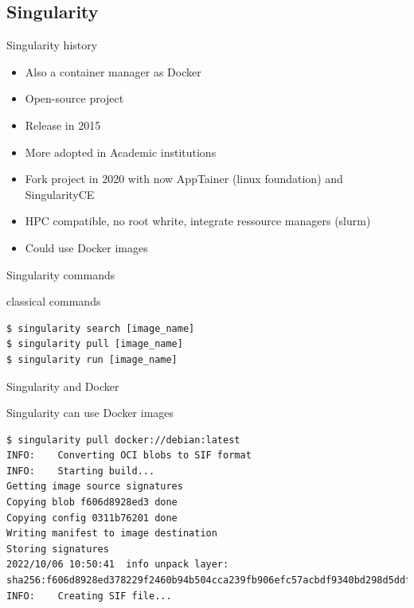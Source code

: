 \subsection{Singularity}
\begin{frame}[<+->]{Singularity history}
\begin{itemize}
\item Also a container manager as Docker
\item Open-source project
\item Release in 2015
\item More adopted in Academic institutions
\item Fork project in 2020 with now AppTainer (linux foundation) and SingularityCE
\item HPC compatible, no root whrite, integrate ressource managers (slurm)
\item Could use Docker images
\end{itemize}
\end{frame}

\begin{frame}[<+->][fragile]{Singularity commands}
\begin{block}{classical commands}
\begin{verbatim}
$ singularity search [image_name]
$ singularity pull [image_name]
$ singularity run [image_name]
\end{verbatim}
\end{block}
\end{frame}

\begin{frame}[<+->][fragile]{Singularity and Docker}
\begin{block}{Singularity can use Docker images}
\begin{verbatim}
$ singularity pull docker://debian:latest
INFO:    Converting OCI blobs to SIF format
INFO:    Starting build...
Getting image source signatures
Copying blob f606d8928ed3 done  
Copying config 0311b76201 done  
Writing manifest to image destination
Storing signatures
2022/10/06 10:50:41  info unpack layer: sha256:f606d8928ed378229f2460b94b504cca239fb906efc57acbdf9340bd298d5ddf
INFO:    Creating SIF file...
\end{verbatim}
\end{block}
\end{frame}
